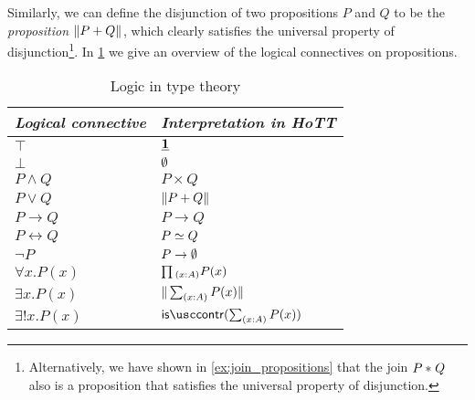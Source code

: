 Similarly, we can define the disjunction of two propositions $P$ and $Q$ to be the \emph{proposition} $\Vert P+Q\Vert_{}$, which clearly satisfies the universal property of disjunction\footnote{Alternatively, we have shown in \cref{ex:join_propositions} that the join ${P}\ast_{}{Q}$ also is a proposition that satisfies the universal property of disjunction.}. In \cref{table:logic} we give an overview of the logical connectives on propositions.

\begin{table}
\caption{\label{table:logic}Logic in type theory}
\begin{center}
\begin{tabular}{ll}
\toprule
\emph{Logical connective} & \emph{Interpretation in HoTT} \\
\midrule
$\top$ & $\underline{\mathbf{1}}$ \\
$\bot$ & $\emptyset$ \\
$P\land Q$ & $P\times Q$ \\
$P\lor Q$ & $\Vert P+Q\Vert_{}$ \\
$P\to Q$ & $P\to Q$ \\
$P\leftrightarrow Q$ & $\eqv{P}{Q}$ \\
$\neg P$ & $P\to\emptyset$ \\
$\forall x.P(x)$ & $\prd{x:A}P(x)$ \\
$\exists x.P(x)$ & $\brck{\sm{x:A}P(x)}$ \\
$\exists! x.P(x)$ & $\iscontr(\sm{x:A}P(x))$ \\
\bottomrule
\end{tabular}
\end{center}
\end{table}

